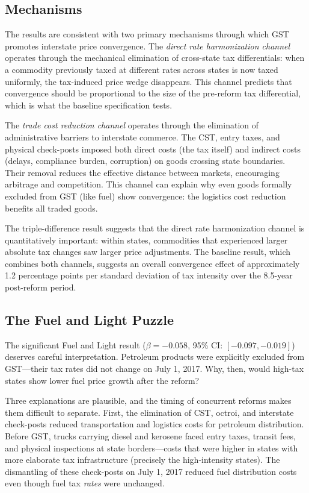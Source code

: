\documentclass[12pt]{article}
\begin{document}
\subsection{Mechanisms}

The results are consistent with two primary mechanisms through which GST promotes interstate price convergence. The \textit{direct rate harmonization channel} operates through the mechanical elimination of cross-state tax differentials: when a commodity previously taxed at different rates across states is now taxed uniformly, the tax-induced price wedge disappears. This channel predicts that convergence should be proportional to the size of the pre-reform tax differential, which is what the baseline specification tests.

The \textit{trade cost reduction channel} operates through the elimination of administrative barriers to interstate commerce. The CST, entry taxes, and physical check-posts imposed both direct costs (the tax itself) and indirect costs (delays, compliance burden, corruption) on goods crossing state boundaries. Their removal reduces the effective distance between markets, encouraging arbitrage and competition. This channel can explain why even goods formally excluded from GST (like fuel) show convergence: the logistics cost reduction benefits all traded goods.

The triple-difference result suggests that the direct rate harmonization channel is quantitatively important: within states, commodities that experienced larger absolute tax changes saw larger price adjustments. The baseline result, which combines both channels, suggests an overall convergence effect of approximately 1.2 percentage points per standard deviation of tax intensity over the 8.5-year post-reform period.

\subsection{The Fuel and Light Puzzle}

The significant Fuel and Light result ($\beta = -0.058$, 95\% CI: $[-0.097, -0.019]$) deserves careful interpretation. Petroleum products were explicitly excluded from GST---their tax rates did not change on July 1, 2017. Why, then, would high-tax states show lower fuel price growth after the reform?

Three explanations are plausible, and the timing of concurrent reforms makes them difficult to separate. First, the elimination of CST, octroi, and interstate check-posts reduced transportation and logistics costs for petroleum distribution. Before GST, trucks carrying diesel and kerosene faced entry taxes, transit fees, and physical inspections at state borders---costs that were higher in states with more elaborate tax infrastructure (precisely the high-intensity states). The dismantling of these check-posts on July 1, 2017 reduced fuel distribution costs even though fuel tax \textit{rates} were unchanged.
\end{document}

